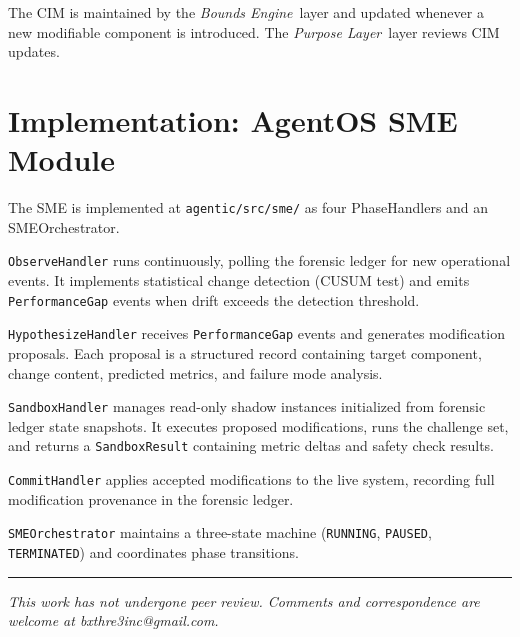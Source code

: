\documentclass[12pt]{article}
\newcommand{\purpose}{\textit{Purpose Layer}}
\newcommand{\bounds}{\textit{Bounds Engine}}
\begin{document}
The CIM is maintained by the \bounds\ layer and updated whenever a new modifiable component is introduced. The \purpose\ layer reviews CIM updates.

\section{Implementation: AgentOS SME Module}
\label{sec:implementation}

The SME is implemented at \texttt{agentic/src/sme/} as four PhaseHandlers and an SMEOrchestrator.

\texttt{ObserveHandler} runs continuously, polling the forensic ledger for new operational events. It implements statistical change detection (CUSUM test) and emits \texttt{PerformanceGap} events when drift exceeds the detection threshold.

\texttt{HypothesizeHandler} receives \texttt{PerformanceGap} events and generates modification proposals. Each proposal is a structured record containing target component, change content, predicted metrics, and failure mode analysis.

\texttt{SandboxHandler} manages read-only shadow instances initialized from forensic ledger state snapshots. It executes proposed modifications, runs the challenge set, and returns a \texttt{SandboxResult} containing metric deltas and safety check results.

\texttt{CommitHandler} applies accepted modifications to the live system, recording full modification provenance in the forensic ledger.

\texttt{SMEOrchestrator} maintains a three-state machine (\texttt{RUNNING}, \texttt{PAUSED}, \texttt{TERMINATED}) and coordinates phase transitions.





\vspace{2em}
\hrule
\vspace{0.5em}
\noindent\small\textit{This work has not undergone peer review. Comments and correspondence are welcome at bxthre3inc@gmail.com.}
\end{document}
